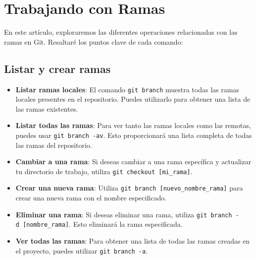 \documentclass[
  letterpaper,
  DIV=11,
  numbers=noendperiod]{scrartcl}
\newenvironment{Shaded}{}{}
\newcommand{\AttributeTok}[1]{\textcolor[rgb]{0.84,0.23,0.29}{#1}}
\newcommand{\ErrorTok}[1]{\textcolor[rgb]{1.00,0.33,0.33}{\underline{#1}}}
\newcommand{\ExtensionTok}[1]{\textcolor[rgb]{0.84,0.23,0.29}{\textbf{#1}}}
\newcommand{\KeywordTok}[1]{\textcolor[rgb]{0.84,0.23,0.29}{#1}}
\newcommand{\NormalTok}[1]{\textcolor[rgb]{0.14,0.16,0.18}{#1}}
\newcommand{\OperatorTok}[1]{\textcolor[rgb]{0.14,0.16,0.18}{#1}}
\begin{document}
\begin{Shaded}
\end{Shaded}

\hypertarget{trabajando-con-ramas}{%
\section{Trabajando con Ramas}\label{trabajando-con-ramas}}

En este artículo, exploraremos las diferentes operaciones relacionadas
con las ramas en Git. Resaltaré los puntos clave de cada comando:

\hypertarget{listar-y-crear-ramas}{%
\subsection{Listar y crear ramas}\label{listar-y-crear-ramas}}

\begin{itemize}
\item
  \textbf{Listar ramas locales}: El comando \texttt{git\ branch} muestra
  todas las ramas locales presentes en el repositorio. Puedes utilizarlo
  para obtener una lista de las ramas existentes.
\item
  \textbf{Listar todas las ramas}: Para ver tanto las ramas locales como
  las remotas, puedes usar \texttt{git\ branch\ -av}. Esto proporcionará
  una lista completa de todas las ramas del repositorio.
\item
  \textbf{Cambiar a una rama}: Si deseas cambiar a una rama específica y
  actualizar tu directorio de trabajo, utiliza
  \texttt{git\ checkout\ {[}mi\_rama{]}}.
\item
  \textbf{Crear una nueva rama}: Utiliza
  \texttt{git\ branch\ {[}nuevo\_nombre\_rama{]}} para crear una nueva
  rama con el nombre especificado.
\item
  \textbf{Eliminar una rama}: Si deseas eliminar una rama, utiliza
  \texttt{git\ branch\ -d\ {[}nombre\_rama{]}}. Esto eliminará la rama
  especificada.
\item
  \textbf{Ver todas las ramas}: Para obtener una lista de todas las
  ramas creadas en el proyecto, puedes utilizar
  \texttt{git\ branch\ -a}.
\end{itemize}
\end{document}
